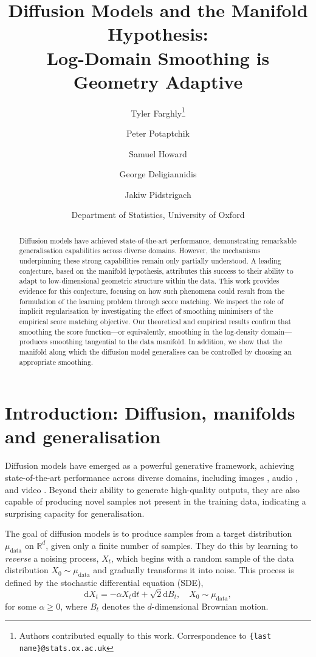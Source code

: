 \documentclass[10pt]{article}
\title{Diffusion Models and the Manifold Hypothesis:\\
Log-Domain Smoothing is Geometry Adaptive}
\author{
    \hspace{50pt}
    \and Tyler Farghly\thanks{Authors contributed equally to this work. Correspondence to \texttt{\{last name\}@stats.ox.ac.uk}}
    \and Peter Potaptchik\footnotemark[1]
    \and Samuel Howard\footnotemark[1]
    \and \hspace{50pt}
    \and George Deligiannidis
    \and Jakiw Pidstrigach \\[-10pt]
    \and Department of Statistics, University of Oxford
}
\newcommand{\mathd}{\mathrm{d}}
\newcommand{\tmop}[1]{\ensuremath{\operatorname{#1}}}
\theoremstyle{plain}
\theoremstyle{definition}
\theoremstyle{remark}
\newcommand{\R}{\mathbb{R}}
\newcommand{\mud}{\mu_{\operatorname{data}}}
\begin{document}
\maketitle

\begin{abstract}
Diffusion models have achieved state-of-the-art performance, demonstrating remarkable generalisation capabilities across diverse domains. However, the mechanisms underpinning these strong capabilities remain only partially understood. A leading conjecture, based on the manifold hypothesis, attributes this success to their ability to adapt to low-dimensional geometric structure within the data. This work provides evidence for this conjecture, focusing on how such phenomena could result from the formulation of the learning problem through score matching. We inspect the role of implicit regularisation by investigating the effect of smoothing minimisers of the empirical score matching objective. Our theoretical and empirical results confirm that smoothing the score function—or equivalently, smoothing in the log-density domain—produces smoothing tangential to the data manifold. In addition, we show that the manifold along which the diffusion model generalises can be controlled by choosing an appropriate smoothing.
\end{abstract}

\section{Introduction: Diffusion, manifolds and generalisation}\label{sec:intro}

Diffusion models \citep{pmlr-v37-sohl-dickstein15, Song19_estimating_grads, Ho202_DDPM, song2021scorebased} have emerged as a powerful generative framework, achieving state-of-the-art performance across diverse domains, including images \citep{dhariwal2021diffusion, karras22_edm, rombach2022_latentdm}, audio \citep{kong2021diffwave, liu2023_audio_ldm}, and video \citep{ho2022imagenvideo, Blattmann_2023_CVPR}. Beyond their ability to generate high-quality outputs, they are also capable of producing novel samples not present in the training data, indicating a surprising capacity for generalisation.

The goal of diffusion models is to produce samples from a target distribution \(\mu_\text{data}\) on \(\R^d\), given only a finite number of samples. They do this by learning to \emph{reverse} a noising process, \(X_t\), which begins with a random sample of the data distribution \(X_0 \sim \mud\) and gradually transforms it into noise. This process is defined by the stochastic differential equation (SDE),
\begin{equation} \label{eqn:forward_sde}
  \mathd X_t = - \alpha X_t \mathd t + \sqrt{2} \mathd B_t, \quad X_0 \sim
  \mu_{\tmop{data}},
\end{equation}
for some $\alpha \ge 0$, where \(B_t\) denotes the \(d\)-dimensional Brownian motion.
\end{document}
